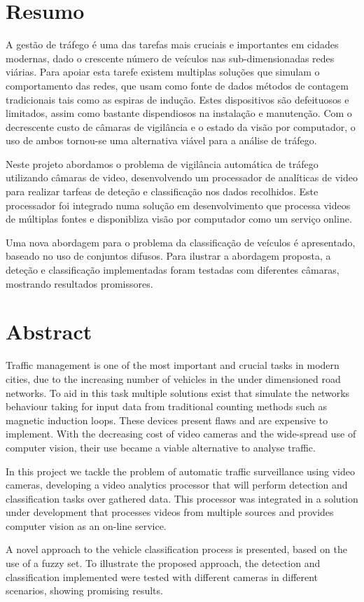 \chapter*{Resumo}
A gestão de tráfego é uma das tarefas mais cruciais e importantes em cidades modernas, dado o crescente número de veículos nas sub-dimensionadas redes viárias. Para apoiar esta tarefe existem multiplas soluções que simulam o comportamento das redes, que usam como fonte de dados métodos de contagem tradicionais tais como as espiras de indução. Estes dispositivos são defeituosos e limitados, assim como bastante dispendiosos na instalação e manutenção. Com o decrescente custo de câmaras de vigilância e o estado da visão por computador, o uso de ambos tornou-se uma alternativa viável para a análise de tráfego.

Neste projeto abordamos o problema de vigilância automática de tráfego utilizando câmaras de video, desenvolvendo um processador de analíticas de video para realizar tarfeas de deteção e classificação nos dados recolhidos. Este processador foi integrado numa solução em desenvolvimento que processa videos de múltiplas fontes e disponibliza visão por computador como um serviço online.

Uma nova abordagem para o problema da classificação de veículos é apresentado, baseado no uso de conjuntos difusos. Para ilustrar a abordagem proposta, a deteção e classificação implementadas foram testadas com diferentes câmaras, mostrando resultados promissores.

\chapter*{Abstract}
Traffic management is one of the most important and crucial tasks in modern cities, due to the increasing number of vehicles in the under dimensioned road networks. To aid in this task multiple solutions exist that simulate the networks behaviour taking for input data from traditional counting methods such as magnetic induction loops. These devices present flaws and are expensive to implement. With the decreasing cost of video cameras and the wide-spread use of computer vision, their use became a viable alternative to analyse traffic.

In this project we tackle the problem of automatic traffic surveillance using video cameras, developing a video analytics processor that will perform detection and classification tasks over gathered data. This processor was integrated in a solution under development that processes videos from multiple sources and provides computer vision as an on-line service.

A novel approach to the vehicle classification process is presented, based on the use of a fuzzy set. To illustrate the proposed approach, the detection and classification implemented were tested with different cameras in different scenarios, showing promising results. 
